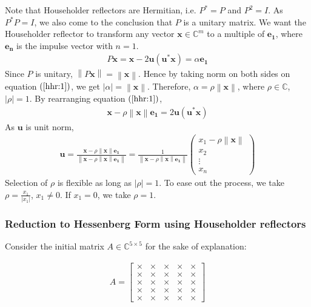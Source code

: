 \documentclass[12pt]{article}
\numberwithin{equation}{section}
\newcommand{\vecb}[1]{\mathbf{#1}}
\newcommand{\brak}[1]{\ensuremath{\left(#1\right)}}
\newcommand{\defmat}[2]{#1\in\mathbb{C}^{#2\times#2}}
\newcommand{\defvec}[2]{\vecb{#1}\in\mathbb{C}^{#2}}
\newcommand{\abs}[1]{\left\vert#1\right\vert}
\newcommand{\norm}[1]{\left\lVert#1\right\rVert}
\begin{document}
Note that Householder reflectors are Hermitian, i.e. $P^{\ast} = P$ and $P^2 = I$. As $P^{\ast}P = I$, we also come to the conclusion
that $P$ is a unitary matrix.
\newline
We want the Householder reflector to transform any vector $\defvec{x}{m}$ to a multiple of $\vecb{e_1}$, where $\vecb{e_n}$ is the impulse vector with $n = 1$.
\begin{align}
\label{hhr:1}
    P\vecb{x} = \vecb{x} - 2\vecb{u}\brak{\vecb{u^{\ast}}\vecb{x}} = \alpha \vecb{e_1}
\end{align}
Since $P$ is unitary, $\norm{P\vecb{x}} = \norm{\vecb{x}}$.
\newline
Hence by taking norm on both sides on equation \brak{\ref{hhr:1}}, we get $\abs{\alpha} = \norm{\vecb{x}}$. Therefore, $\alpha = \rho\norm{\vecb{x}}$, where $\rho \in \mathbb{C}$, $\abs{\rho} = 1$. 
\newline
By rearranging equation \brak{\ref{hhr:1}},
\begin{align}
    \vecb{x} - \rho\norm{\vecb{x}}\vecb{e_1} = 2\vecb{u}\brak{\vecb{u^{\ast}}\vecb{x}}
\end{align}
As $\vecb{u}$ is unit norm,
\begin{align}
\label{hhr:2}
    \vecb{u} = \frac{\vecb{x} - \rho\norm{\vecb{x}}\vecb{e_1}}{\norm{\vecb{x} - \rho\norm{\vecb{x}}\vecb{e_1}}} = \frac{1}{\norm{\vecb{x} - \rho\norm{\vecb{x}}\vecb{e_1}}} \begin{pmatrix} x_1 - \rho\norm{\vecb{x}}\\x_2\\\vdots\\x_n\end{pmatrix}
\end{align}
Selection of $\rho$ is flexible as long as $\abs{\rho} = 1$. To ease out the process, we take $\rho = \frac{x_1}{\abs{x_1}}$, $x_1 \neq 0$. If $x_1 = 0$, we take $\rho = 1$.

\subsubsection{Reduction to Hessenberg Form using Householder reflectors}
Consider the initial matrix $\defmat{A}{5}$ for the sake of explanation:

\begin{align}
A = \begin{bmatrix}
\times & \times & \times & \times & \times\\
\times & \times & \times & \times & \times\\
\times & \times & \times & \times & \times\\
\times & \times & \times & \times & \times\\
\times & \times & \times & \times & \times
\end{bmatrix}
\end{align}
\end{document}
